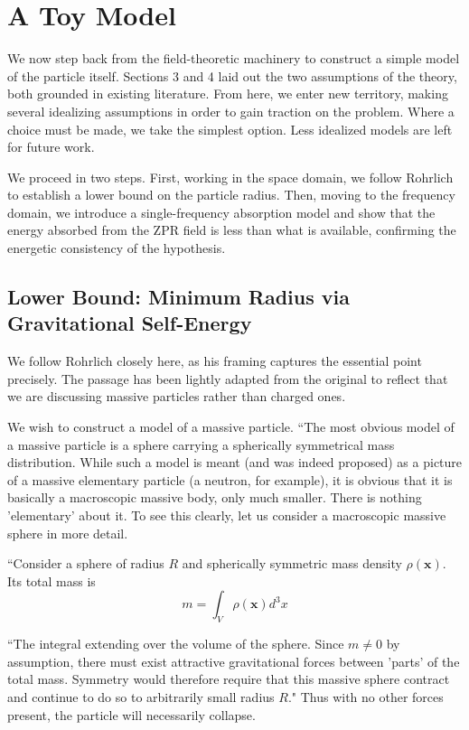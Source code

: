 \documentclass {article}
\renewcommand\vec{\mathbf}
\begin{document}
\section{A Toy Model}
\label{sec:toymodel}

We now step back from the field-theoretic machinery to construct a simple model of the particle itself. Sections 3 and 4 laid out the two assumptions of the theory, both grounded in existing literature. From here, we enter new territory, making several idealizing assumptions in order to gain traction on the problem. Where a choice must be made, we take the simplest option. Less idealized models are left for future work.

We proceed in two steps. First, working in the space domain, we follow Rohrlich to establish a lower bound on the particle radius. Then, moving to the frequency domain, we introduce a single-frequency absorption model and show that the energy absorbed from the ZPR field is less than what is available, confirming the energetic consistency of the hypothesis.

\subsection{Lower Bound: Minimum Radius via Gravitational Self-Energy}

We follow Rohrlich\cite{rohrlich} closely here, as his framing captures the essential point precisely. The passage has been lightly adapted from the original to reflect that we are discussing massive particles rather than charged ones.

We wish to construct a model of a massive particle. ``The most obvious model of a massive particle is a sphere carrying a spherically symmetrical mass distribution. While such a model is meant (and was indeed proposed) as a picture of a massive elementary particle (a neutron, for example), it is obvious that it is basically a macroscopic massive body, only much smaller. There is nothing 'elementary' about it. To see this clearly, let us consider a macroscopic massive sphere in more detail.

``Consider a sphere of radius $R$ and spherically symmetric mass density $\rho (\vec x)$. Its total mass is
\begin{equation}
m = \int_V \rho(\vec x) d^3x
\end{equation}

``The integral extending over the volume of the sphere. Since $m \neq 0$ by assumption, there must exist attractive gravitational forces between 'parts' of the total mass. Symmetry would therefore require that this massive sphere contract and continue to do so to arbitrarily small radius $R$."  Thus with no other forces present, the particle will necessarily collapse.
\end{document}
